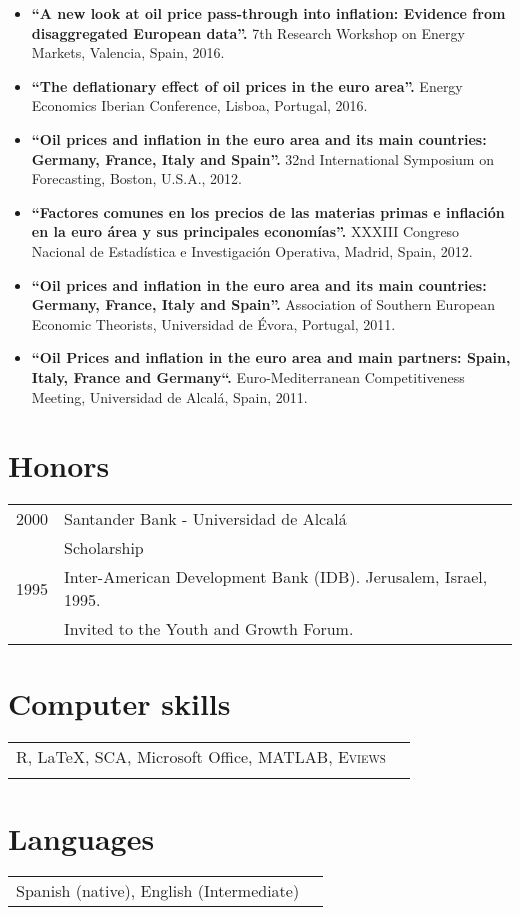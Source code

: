 \documentclass[11pt]{article}\usepackage[]{graphicx}\usepackage[]{color}
\begin{document}
\begin{itemize}

\item \textbf{``A new look at oil price pass-through into inflation: Evidence from disaggregated European data''.} 7th Research Workshop on Energy Markets, Valencia, Spain, 2016.

\item \textbf{``The deflationary effect of oil prices in the euro area''.} Energy Economics Iberian Conference, Lisboa, Portugal, 2016.

\item \textbf{``Oil prices and inflation in the euro area and its main countries: Germany, France, Italy and Spain''.} 32nd International Symposium on Forecasting, Boston, U.S.A., 2012.

\item \textbf{``Factores comunes en los precios de las materias primas e inflación en la euro área y sus principales economías''.} XXXIII Congreso Nacional de Estadística e Investigación Operativa, Madrid, Spain, 2012.

\item \textbf{``Oil prices and inflation in the euro area and its main countries: Germany, France, Italy and Spain''.} Association of Southern European Economic Theorists, Universidad de Évora, Portugal, 2011.

\item \textbf{``Oil Prices and inflation in the euro area and main partners: Spain, Italy, France and Germany``.} Euro-Mediterranean Competitiveness Meeting, Universidad de Alcalá, Spain, 2011.

\end{itemize}


\section{Honors} 

\begin{tabular}{rl}
2000	 & Santander Bank - Universidad de Alcalá\\
\vspace{5pt}&  Scholarship\\

1995 & Inter-American Development Bank (IDB). Jerusalem, Israel, 1995.\\
& Invited to the Youth and Growth Forum. 

\end{tabular}


\section{Computer skills} 

\begin{tabular}{rl}
R, {\LaTeX}, SCA, Microsoft Office, \textsc{MATLAB}, \textsc{Eviews}\\
&
\end{tabular}


\section{Languages} 

\begin{tabular}{rl}
Spanish (native), English (Intermediate)
\end{tabular}
\end{document}
